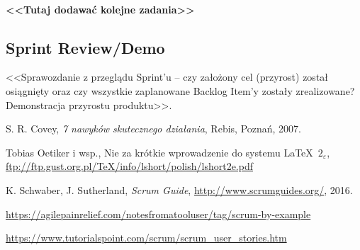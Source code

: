 \documentclass[a4paper]{article}
\begin{document}
\paragraph{<<Tutaj dodawać kolejne zadania>>}


\subsection{Sprint Review/Demo}
<<Sprawozdanie z przeglądu Sprint'u -- czy założony cel (przyrost) został osiągnięty oraz czy wszystkie zaplanowane Backlog Item'y zostały zrealizowane? Demonstracja przyrostu produktu>>.

\begin{thebibliography}{9}

 S. R. Covey, {\em 7 nawyków skutecznego działania}, Rebis, Poznań, 2007.

 Tobias Oetiker i wsp., Nie za krótkie wprowadzenie do systemu \LaTeX  \ $2_\varepsilon$, \url{ftp://ftp.gust.org.pl/TeX/info/lshort/polish/lshort2e.pdf}

 K. Schwaber, J. Sutherland, {\em Scrum Guide}, \url{http://www.scrumguides.org/}, 2016.

 \url{https://agilepainrelief.com/notesfromatooluser/tag/scrum-by-example}

 \url{https://www.tutorialspoint.com/scrum/scrum_user_stories.htm}

\end{thebibliography}
\end{document}
